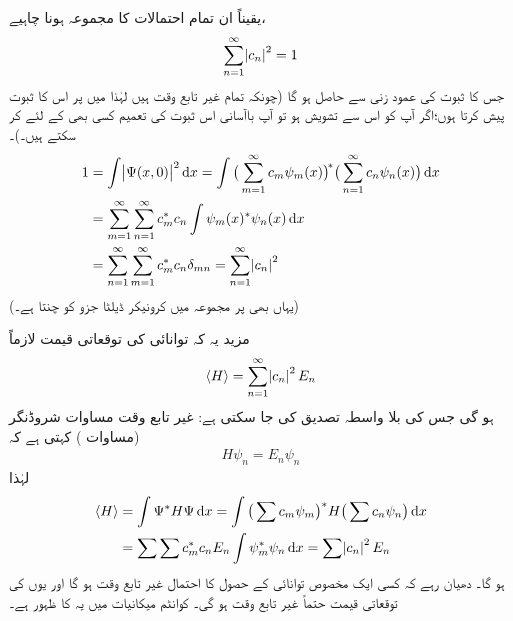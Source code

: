 یقیناً ان تمام احتمالات کا مجموعہ  ہونا چاہیے،
\begin{align}
\sum_{n=1}^{\infty}\abs{c_n}^2=1
\end{align}
جس کا ثبوت  کی عمود زنی سے حاصل ہو گا (چونکہ تمام  غیر تابع وقت ہیں لہٰذا میں  پر اس کا  ثبوت پیش کرتا ہوں؛اگر آپ کو اس سے تشویش ہو تو  آپ باآسانی اس ثبوت کی تعمیم کسی بھی   کے لئے کر سکتے ہیں۔)۔
\begin{align*}
1&=\int\abs{\Psi(x,0)}^2\dif x=\int \big(\sum_{m=1}^{\infty}c_m\psi_m(x)\big)^{\!*}\big(\sum_{n=1}^{\infty}c_n\psi_n(x)\big)\dif x\\
&=\sum_{m=1}^{\infty}\sum_{n=1}^{\infty}c_m^*c_n\int\psi_m(x)^*\psi_n(x)\dif x\\
&=\sum_{n=1}^{\infty}\sum_{m=1}^{\infty}c_m^*c_n\delta_{mn}=\sum_{n=1}^{\infty}\abs{c_n}^2
\end{align*}
(یہاں بھی  پر مجموعہ  میں کرونیکر ڈیلٹا جزو  کو چنتا ہے۔)

مزید یہ کہ  توانائی کی توقعاتی قیمت لازماً 
\begin{align}\label{مساوات_غیر_تابع_وقت_توانائی_توقعاتی_قیمت}
\langle H\rangle=\sum_{n=1}^{\infty} \abs{c_n}^2 E_n
\end{align} 
ہو گی   جس کی بلا واسطہ تصدیق کی جا سکتی ہے: غیر تابع وقت مساوات شروڈنگر (مساوات ) کہتی ہے کہ
\begin{align}
H\psi_n=E_n\psi_n
\end{align}
لہٰذا
\begin{align*}
\langle H \rangle &=\int \Psi^*H\Psi\dif x=\int \big(\sum c_m\psi_m\big)^* H\big(\sum c_n\psi_n\big)\dif x\\
&=\sum\sum c_m^*c_nE_n\int \psi_m^*\psi_n\dif x=\sum\abs{c_n}^2 E_n
\end{align*}
ہو گا۔ دھیان رہے کہ کسی ایک مخصوص توانائی کے حصول کا احتمال غیر تابع وقت ہو گا اور یوں  کی توقعاتی قیمت حتماً  غیر تابع وقت ہو گی۔ کوانٹم میکانیات میں یہ  کا ظہور ہے۔

